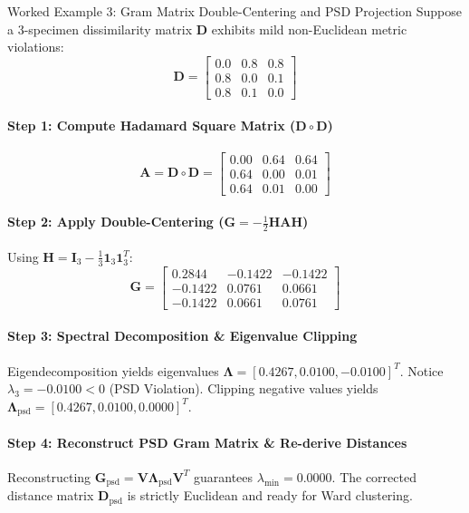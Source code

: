 \documentclass[11pt,a4paper]{article}
\begin{document}
\begin{examplebox}{Worked Example 3: Gram Matrix Double-Centering and PSD Projection}
Suppose a 3-specimen dissimilarity matrix $\mathbf{D}$ exhibits mild non-Euclidean metric violations:
$$\mathbf{D} = \begin{bmatrix} 0.0 & 0.8 & 0.8 \\ 0.8 & 0.0 & 0.1 \\ 0.8 & 0.1 & 0.0 \end{bmatrix}$$
\paragraph{Step 1: Compute Hadamard Square Matrix ($\mathbf{D} \circ \mathbf{D}$)}
$$\mathbf{A} = \mathbf{D} \circ \mathbf{D} = \begin{bmatrix} 0.00 & 0.64 & 0.64 \\ 0.64 & 0.00 & 0.01 \\ 0.64 & 0.01 & 0.00 \end{bmatrix}$$

\paragraph{Step 2: Apply Double-Centering ($\mathbf{G} = -\frac{1}{2} \mathbf{H} \mathbf{A} \mathbf{H}$)}
Using $\mathbf{H} = \mathbf{I}_3 - \frac{1}{3} \mathbf{1}_3 \mathbf{1}_3^T$:
$$\mathbf{G} = \begin{bmatrix} 0.2844 & -0.1422 & -0.1422 \\ -0.1422 & 0.0761 & 0.0661 \\ -0.1422 & 0.0661 & 0.0761 \end{bmatrix}$$

\paragraph{Step 3: Spectral Decomposition \& Eigenvalue Clipping}
Eigendecomposition yields eigenvalues $\mathbf{\Lambda} = [0.4267, 0.0100, -0.0100]^T$.
Notice $\lambda_3 = -0.0100 < 0$ (PSD Violation). Clipping negative values yields $\mathbf{\Lambda}_{\text{psd}} = [0.4267, 0.0100, 0.0000]^T$.

\paragraph{Step 4: Reconstruct PSD Gram Matrix \& Re-derive Distances}
Reconstructing $\mathbf{G}_{\text{psd}} = \mathbf{V} \mathbf{\Lambda}_{\text{psd}} \mathbf{V}^T$ guarantees $\lambda_{\text{min}} = 0.0000$. The corrected distance matrix $\mathbf{D}_{\text{psd}}$ is strictly Euclidean and ready for Ward clustering.
\end{examplebox}
\end{document}
